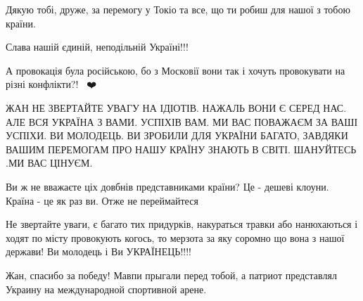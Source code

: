 \begin{itemize}
Дякую тобі, друже, за перемогу у Токіо та все, що ти робиш для нашої з тобою
країни.

Слава нашій єдиній, неподільній Україні!!!


 

А провокація була російською, бо з Московії вони так і хочуть провокувати на різні конфлікти?!🙏🏻😇❤️

 

ЖАН НЕ ЗВЕРТАЙТЕ УВАГУ НА ІДІОТІВ. НАЖАЛЬ ВОНИ Є СЕРЕД НАС. АЛЕ ВСЯ УКРАЇНА З
ВАМИ. УСПІХІВ ВАМ. МИ ВАС ПОВАЖАЄМ ЗА ВАШІ УСПІХИ. ВИ МОЛОДЕЦЬ. ВИ ЗРОБИЛИ ДЛЯ
УКРАЇНИ БАГАТО, ЗАВДЯКИ ВАШИМ ПЕРЕМОГАМ ПРО НАШУ КРАЇНУ ЗНАЮТЬ В СВІТІ. ШАНУЙТЕСЬ
.МИ ВАС ЦІНУЄМ.


 
Ви ж не вважаєте ціх довбнів представниками країни? Це - дешеві клоуни. Країна - це як раз ви. Отже не переймайтеся

 

Не звертайте уваги, є багато тих придурків, накураться травки або нанюхаються і
ходят по місту провокують когось, то мерзота за яку соромно що вона з нашої
держави! Ви молодець і Ви УКРАЇНЕЦЬ!!!!


 
Жан, спасибо за победу! Мавпи прыгали перед тобой, а патриот представлял Украину на международной спортивной арене.


\end{itemize}
